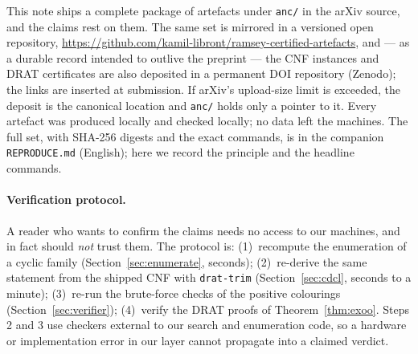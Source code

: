 \documentclass[11pt]{article}
\theoremstyle{definition}
\theoremstyle{plain}
\begin{document}
This note ships a complete package of artefacts under \texttt{anc/} in the arXiv
source, and the claims rest on them. The same set is mirrored in a versioned open
repository, \url{https://github.com/kamil-libront/ramsey-certified-artefacts},
and --- as a durable record intended to outlive the preprint --- the
CNF instances and DRAT certificates are also deposited in a permanent DOI
repository (Zenodo); the links are inserted at submission. If arXiv's upload-size
limit is exceeded, the deposit is the canonical location and \texttt{anc/} holds
only a pointer to it. Every artefact was produced locally and checked locally; no
data left the machines. The full set, with SHA-256 digests and the exact
commands, is in the companion \texttt{REPRODUCE.md} (English); here we record the
principle and the headline commands.

\paragraph{Verification protocol.} A reader who wants to confirm the claims
needs no access to our machines, and in fact should \emph{not} trust them. The
protocol is: (1)~recompute the enumeration of a cyclic family
(Section~\ref{sec:enumerate}, seconds); (2)~re-derive the same statement from
the shipped CNF with \texttt{drat-trim} (Section~\ref{sec:cdcl}, seconds to a
minute); (3)~re-run the brute-force checks of the positive colourings
(Section~\ref{sec:verifier}); (4)~verify the DRAT proofs of
Theorem~\ref{thm:exoo}. Steps 2 and 3 use checkers external to our search and
enumeration code, so a hardware or implementation error in our layer cannot
propagate into a claimed verdict.
\end{document}
